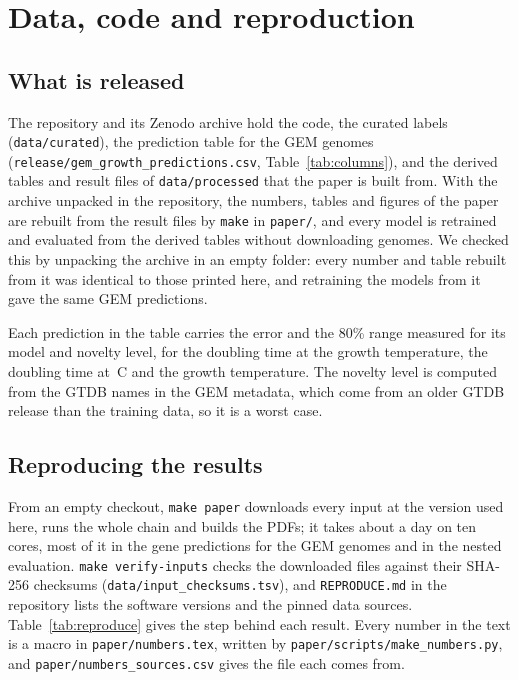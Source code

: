 \section{Data, code and reproduction}

\subsection{What is released}
The repository and its Zenodo archive hold the code, the curated labels (\texttt{data/curated}), the prediction table for
the GEM genomes (\texttt{release/gem\_growth\_predictions.csv}, Table~\ref{tab:columns}), and the derived tables and result
files of \texttt{data/processed} that the paper is built from. With the archive unpacked in the repository, the numbers,
tables and figures of the paper are rebuilt from the result files by \texttt{make} in \texttt{paper/}, and every model is
retrained and evaluated from the derived tables without downloading genomes. We checked this by unpacking the archive in
an empty folder: every number and table rebuilt from it was identical to those printed here, and retraining the models from it gave the
same GEM predictions.

Each prediction in the table carries the error and the 80\% range measured for its model and novelty level, for the
doubling time at the growth temperature, the doubling time at \TRefC\,\textdegree C and the growth temperature. The
novelty level is computed from the GTDB names in the GEM metadata, which come from an older GTDB release than the training
data, so it is a worst case.



\subsection{Reproducing the results}
From an empty checkout, \texttt{make paper} downloads every input at the version used here, runs the whole chain and
builds the PDFs; it takes about a day on ten cores, most of it in the gene predictions for the GEM genomes and in the nested
evaluation. \texttt{make verify-inputs} checks the downloaded files against their SHA-256 checksums
(\texttt{data/input\_checksums.tsv}), and \texttt{REPRODUCE.md} in the repository lists the software versions and the
pinned data sources. Table~\ref{tab:reproduce} gives the
step behind each result. Every number in the text is a macro in \texttt{paper/numbers.tex}, written by
\texttt{paper/scripts/make\_numbers.py}, and \texttt{paper/numbers\_sources.csv} gives the file each comes from.

